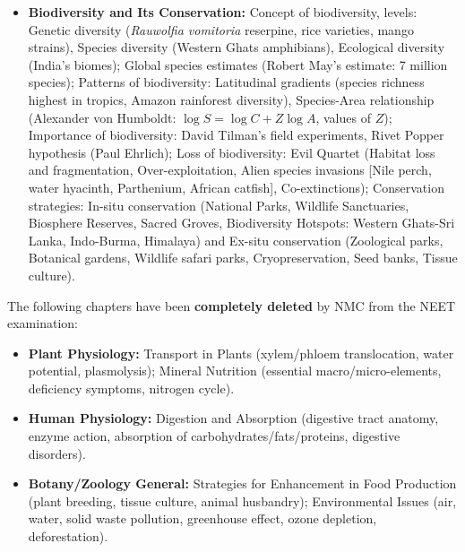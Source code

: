 \documentclass[11pt,a4paper]{article}
\begin{document}
\begin{itemize}
  \item \textbf{Biodiversity and Its Conservation:} Concept of biodiversity, levels: Genetic diversity (\textit{Rauwolfia vomitoria} reserpine, rice varieties, mango strains), Species diversity (Western Ghats amphibians), Ecological diversity (India's biomes); Global species estimates (Robert May's estimate: 7 million species); Patterns of biodiversity: Latitudinal gradients (species richness highest in tropics, Amazon rainforest diversity), Species-Area relationship (Alexander von Humboldt: $\log S = \log C + Z\log A$, values of $Z$); Importance of biodiversity: David Tilman's field experiments, Rivet Popper hypothesis (Paul Ehrlich); Loss of biodiversity: Evil Quartet (Habitat loss and fragmentation, Over-exploitation, Alien species invasions [Nile perch, water hyacinth, Parthenium, African catfish], Co-extinctions); Conservation strategies: In-situ conservation (National Parks, Wildlife Sanctuaries, Biosphere Reserves, Sacred Groves, Biodiversity Hotspots: Western Ghats-Sri Lanka, Indo-Burma, Himalaya) and Ex-situ conservation (Zoological parks, Botanical gardens, Wildlife safari parks, Cryopreservation, Seed banks, Tissue culture).
\end{itemize}

\begin{trapbox}
The following chapters have been \textbf{completely deleted} by NMC from the NEET examination:
\begin{itemize}
  \item \textbf{Plant Physiology:} Transport in Plants (xylem/phloem translocation, water potential, plasmolysis); Mineral Nutrition (essential macro/micro-elements, deficiency symptoms, nitrogen cycle).
  \item \textbf{Human Physiology:} Digestion and Absorption (digestive tract anatomy, enzyme action, absorption of carbohydrates/fats/proteins, digestive disorders).
  \item \textbf{Botany/Zoology General:} Strategies for Enhancement in Food Production (plant breeding, tissue culture, animal husbandry); Environmental Issues (air, water, solid waste pollution, greenhouse effect, ozone depletion, deforestation).
\end{itemize}
\end{trapbox}

\newpage

\end{document}
